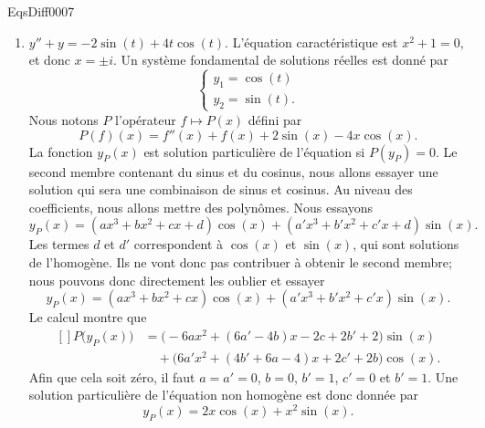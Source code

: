 \begin{corrige}{EqsDiff0007}
\begin{enumerate}
\item
$y''+y=-2\sin(t)+4t\cos(t)$. L'équation caractéristique est $x^2+1=0$, et donc $x=\pm i$. Un système fondamental de solutions réelles est donné par
\begin{equation}
	\left\{
\begin{array}{ll}
y_1=\cos(t)\\
y_2=\sin(t).
\end{array}
\right.
\end{equation}
Nous notons $P$ l'opérateur $f\mapsto P(x)$ défini par
\begin{equation}
	P(f)(x)=f''(x)+f(x)+2\sin(x)-4x\cos(x).
\end{equation}
La fonction $y_P(x)$ est solution particulière de l'équation si $P(y_P)=0$. Le second membre contenant du sinus et du cosinus, nous allons essayer une solution qui sera une combinaison de sinus et cosinus. Au niveau des coefficients, nous allons mettre des polynômes. Nous essayons
\begin{equation}
	y_P(x)=(ax^3+bx^2+cx+d)\cos(x)+(a'x^3+b'x^2+c'x+d)\sin(x).
\end{equation}
Les termes $d$ et $d'$ correspondent à $\cos(x)$ et $\sin(x)$, qui sont solutions de l'homogène. Ils ne vont donc pas contribuer à obtenir le second membre; nous pouvons donc directement les oublier et essayer
\begin{equation}
	y_P(x)=(ax^3+bx^2+cx)\cos(x)+(a'x^3+b'x^2+c'x)\sin(x).
\end{equation}
Le calcul montre que
\begin{equation}
	\begin{aligned}[]
		P\big( y_P(x) \big)&=\big( -6ax^2+(6a'-4b)x-2c+2b'+2 \big)\sin(x)\\
				&\quad+\big( 6a'x^2+(4b'+6a-4)x+2c'+2b \big)\cos(x).
	\end{aligned}
\end{equation}
Afin que cela soit zéro, il faut $a=a'=0$, $b=0$, $b'=1$, $c'=0$ et $b'=1$. Une solution particulière de l'équation non homogène est donc donnée par
\begin{equation}
	y_P(x)=2x\cos(x)+x^2\sin(x).
\end{equation}


\end{enumerate}
\end{corrige}
